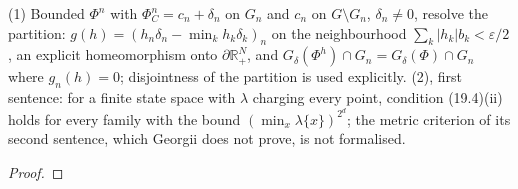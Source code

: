\begin{proposition}
    \label{prop:dg-19-5}
    \leanok

    (1) Bounded $\Phi^n$ with $\Phi^n_C = c_n + \delta_n$ on $G_n$ and $c_n$ on $G \setminus G_n$,
    $\delta_n \neq 0$, resolve the partition: $g(h) = (h_n\delta_n - \min_k h_k\delta_k)_n$ on the
    neighbourhood $\sum_k |h_k| b_k < \varepsilon/2$, an explicit homeomorphism onto
    $\partial\mathbb R^N_+$, and $G_\delta(\Phi^h) \cap G_n = G_\delta(\Phi) \cap G_n$ where
    $g_n(h) = 0$; disjointness of the partition is used explicitly. (2), first sentence: for a
    finite state space with $\lambda$ charging every point, condition (19.4)(ii) holds for every
    family with the bound $(\min_x\lambda\{x\})^{2^d}$; the metric criterion of its second
    sentence, which Georgii does not prove, is not formalised.
\end{proposition}
\begin{proof}
    \leanok
\end{proof}

